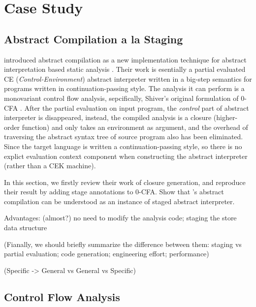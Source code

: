 \section{Case Study} \label{cases_study}

\subsection{Abstract Compilation a la Staging}

\citeauthor{Boucher:1996:ACN:647473.727587} introduced abstract compilation as a new
implementation technique for abstract interpretation based static analysis \cite{Boucher:1996:ACN:647473.727587}.
Their work is esentially a partial evaluated CE (\textit{Control-Environment}) abstract
interpreter written in a big-step semantics for programs written in continuation-passing style.
The analysis it can perform is a monovariant control flow analysis, sepcifically, Shiver's original
formulation of 0-CFA \cite{Shivers:1991:SSC:115865.115884, Shivers:1988:CFA:53990.54007}.
After the partial evaluation on input program, the \textit{control} part of abstract interpreter
is disappeared, instead, the compiled analysis is a closure (higher-order function) and
only takes an environment as argument,
and the overhead of traversing the abstract syntax tree of source program also has been eliminated.
Since the target language is written a continuation-passing style, so there is
no explict evaluation context component when constructing the abstract interpreter
(rather than a CEK machine).

In this section, we firstly review their work of closure generation,
and reproduce their result by adding stage annotations to 0-CFA.
Show that \citeauthor{Boucher:1996:ACN:647473.727587}'s abstract compilation can be understood as an instance of staged 
abstract interpreter.

Advantages: (almost?) no need to modify the analysis code; staging the store data structure

(Fianally, we should briefly summarize the difference between them:
staging vs partial evaluation; code generation; engineering effort; performance)

(Specific -> General vs General vs Specific)


\subsection{Control Flow Analysis}

